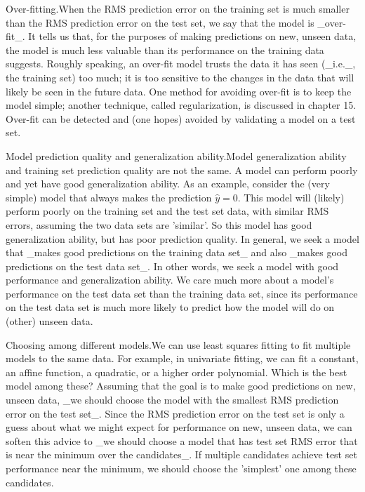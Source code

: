 Over-fitting.When the RMS prediction error on the training set is much smaller than the RMS prediction error on the test set, we say that the model is _over-fit_. It tells us that, for the purposes of making predictions on new, unseen data, the model is much less valuable than its performance on the training data suggests. Roughly speaking, an over-fit model trusts the data it has seen (_i.e._, the training set) too much; it is too sensitive to the changes in the data that will likely be seen in the future data. One method for avoiding over-fit is to keep the model simple; another technique, called regularization, is discussed in chapter 15. Over-fit can be detected and (one hopes) avoided by validating a model on a test set.

Model prediction quality and generalization ability.Model generalization ability and training set prediction quality are not the same. A model can perform poorly and yet have good generalization ability. As an example, consider the (very simple) model that always makes the prediction \(\hat{y}=0\). This model will (likely) perform poorly on the training set and the test set data, with similar RMS errors, assuming the two data sets are 'similar'. So this model has good generalization ability, but has poor prediction quality. In general, we seek a model that _makes good predictions on the training data set_ and also _makes good predictions on the test data set_. In other words, we seek a model with good performance and generalization ability. We care much more about a model's performance on the test data set than the training data set, since its performance on the test data set is much more likely to predict how the model will do on (other) unseen data.

Choosing among different models.We can use least squares fitting to fit multiple models to the same data. For example, in univariate fitting, we can fit a constant, an affine function, a quadratic, or a higher order polynomial. Which is the best model among these? Assuming that the goal is to make good predictions on new, unseen data, _we should choose the model with the smallest RMS prediction error on the test set_. Since the RMS prediction error on the test set is only a guess about what we might expect for performance on new, unseen data, we can soften this advice to _we should choose a model that has test set RMS error that is near the minimum over the candidates_. If multiple candidates achieve test set performance near the minimum, we should choose the 'simplest' one among these candidates.

